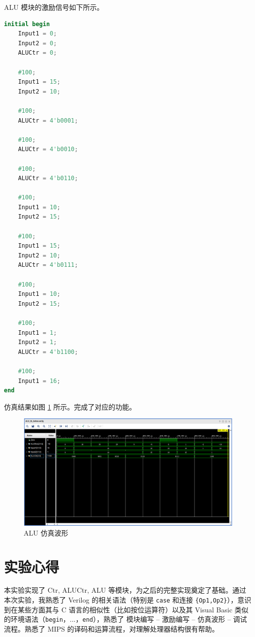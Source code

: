 \documentclass[a4paper,UTF8]{ctexart}
\begin{document}
ALU 模块的激励信号如下所示。
\begin{multicols}{2}
    \begin{lstlisting}[language=verilog,caption={ALU\_tb.v}]
    initial begin
    Input1 = 0;
    Input2 = 0;
    ALUCtr = 0;
    
    #100;
    Input1 = 15;
    Input2 = 10;

    #100;
    ALUCtr = 4'b0001;

    #100;
    ALUCtr = 4'b0010;

    #100;
    ALUCtr = 4'b0110;

    #100;
    Input1 = 10;
    Input2 = 15;

    #100;
    Input1 = 15;
    Input2 = 10;
    ALUCtr = 4'b0111;

    #100;
    Input1 = 10;
    Input2 = 15;

    #100;
    Input1 = 1;
    Input2 = 1;
    ALUCtr = 4'b1100;

    #100;
    Input1 = 16;
end
\end{lstlisting}
\end{multicols}


仿真结果如图 \ref{fig:alutb} 所示。完成了对应的功能。
\begin{figure}[H]
    \centering
    \includegraphics[width=\textwidth]{figure3.png}
    \caption{ALU 仿真波形}
    \label{fig:alutb}
\end{figure}

\section{实验心得}

本实验实现了 Ctr, ALUCtr, ALU 等模块，为之后的完整实现奠定了基础。通过本次实验，我熟悉了 Verilog 的相关语法（特别是 \verb"case" 和连接 \verb"{Op1,Op2}"），意识到在某些方面其与 C 语言的相似性（比如按位运算符）以及其 Visual Basic 类似的环境语法（\verb"begin"，...，\verb"end"），熟悉了 模块编写 -- 激励编写 -- 仿真波形 -- 调试流程。熟悉了 MIPS 的译码和运算流程，对理解处理器结构很有帮助。
\end{document}
